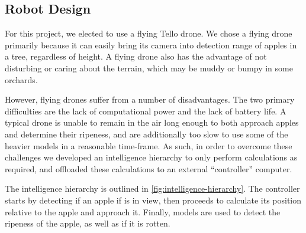 \subsection{Robot Design}\label{subsec:robot-design}
For this project, we elected to use a flying Tello drone.
We chose a flying drone primarily because it can easily bring its camera into detection range of apples in a tree, regardless of height.
A flying drone also has the advantage of not disturbing or caring about the terrain, which may be muddy or bumpy in some orchards.

However, flying drones suffer from a number of disadvantages.
The two primary difficulties are the lack of computational power and the lack of battery life.
A typical drone is unable to remain in the air long enough to both approach apples and determine their ripeness, and are  additionally too slow to use some of the heavier models in a reasonable time-frame.
As such, in order to overcome these challenges we developed an intelligence hierarchy to only perform calculations as required, and offloaded these calculations to an external ``controller'' computer.

The intelligence hierarchy is outlined in \autoref{fig:intelligence-hierarchy}.
The controller starts by detecting if an apple if is in view, then proceeds to calculate its position relative to the apple and approach it.
Finally, models are used to detect the ripeness of the apple, as well as if it is rotten.



